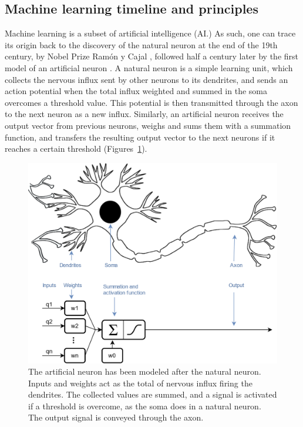 \subsection{Machine learning timeline and principles}

Machine learning is a subset of artificial intelligence (AI.) As such, one can trace its origin back to the discovery of the natural neuron at the end of the 19th century, by Nobel Prize Ramón y Cajal \cite{Lopez2006}, followed half a century later by the first model of an artificial neuron \cite{Mcculloch1943}. A natural neuron is a simple learning unit, which collects the nervous influx sent by other neurons to its dendrites, and sends an action potential when the total influx weighted and summed in the soma overcomes a threshold value. This potential is then transmitted through the axon to the next neuron as a new influx. Similarly, an artificial neuron receives the output vector from previous neurons, weighs and sums them with a summation function, and transfers the resulting output vector to the next neurons if it reaches a certain threshold (Figures~\ref{fig_neuron}). 

\begin{figure}[hbtp]
	\centering
	\def\svgwidth{1\columnwidth}
	\fontsize{10pt}{10pt}\selectfont
	\includegraphics[width=\linewidth]{"../Chap2/Figures/Fig_neuron.png"}
	\caption{The artificial neuron has been modeled after the natural neuron. Inputs and weights act as the total of nervous influx firing the dendrites. The collected values are summed, and a signal is activated if a threshold is overcome, as the soma does in a natural neuron. The output signal is conveyed through the axon.}
	\label{fig_neuron}
\end{figure}

